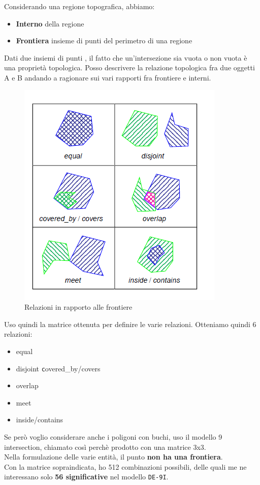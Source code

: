 \documentclass[a4paper,12pt]{article}
\begin{document}
Considerando una regione topografica, abbiamo:
\begin{itemize}
\item \textbf{Interno} della regione
\item \textbf{Frontiera} insieme di punti del perimetro di una regione
\end{itemize}

Dati due insiemi di punti , il fatto che un'intersezione sia vuota o non vuota è una proprietà topologica. Posso descrivere la relazione topologica fra due oggetti A e B andando a ragionare sui vari rapporti fra frontiere e interni.
\begin{figure}[H]
	\centering
	\includegraphics[width=0.5\linewidth]{Immagini/front}
	\caption{Relazioni in rapporto alle frontiere}
\end{figure}
Uso quindi la matrice ottenuta per definire le varie relazioni.
Otteniamo quindi 6 relazioni:
\begin{itemize}
\item equal
\item disjoint
\texttt covered\_by/covers
\item overlap
\item meet
\item inside/contains
\end{itemize}
Se però voglio considerare anche i poligoni con buchi, uso il modello 9 intersection, chiamato così perchè prodotto con una matrice 3x3.\\
Nella formulazione delle varie entità, il punto \textbf{non ha una frontiera}.\\
Con la matrice sopraindicata, ho 512 combinazioni possibili, delle quali me ne interessano solo \textbf{56 significative} nel modello \texttt{DE-9I}.
\end{document}
